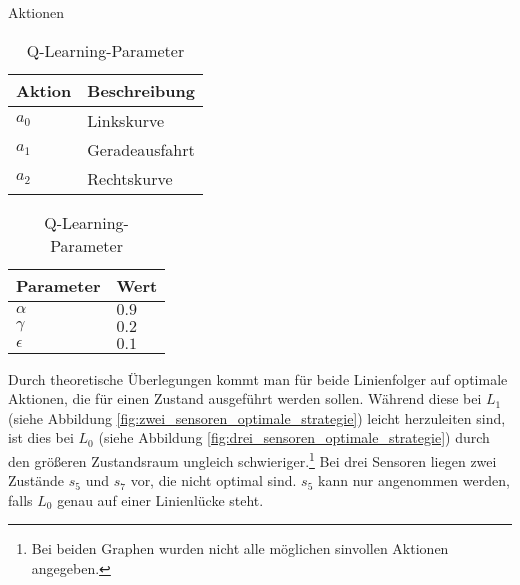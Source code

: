 \begin{table}
\centering

\begin{minipage}{.4\textwidth}
\caption{Aktionen}
  \label{tab:aktionen}
  \renewcommand{\arraystretch}{1.2}
  \centering
  \sffamily
  \begin{footnotesize}
    \begin{tabular}{l l}
    \toprule
    \textbf{Aktion} & \textbf{Beschreibung}\\
    \midrule
    $a_0$ & Linkskurve\\
    $a_1$ & Ge­ra­de­aus­fahrt\\
    $a_2$ & Rechtskurve\\
    \bottomrule
    \end{tabular}
  \end{footnotesize}
  \rmfamily
\end{minipage}\hfill
\begin{minipage}{.4\textwidth}
\caption{Q-Learning-Parameter}
  \label{tab:q-parameter}
  \renewcommand{\arraystretch}{1.2}
  \centering
  \sffamily
  \begin{footnotesize}
    \begin{tabular}{l l}
    \toprule
    \textbf{Parameter} & \textbf{Wert}\\
    \midrule
    $\alpha$  & $0.9$\\
    $\gamma$  & $0.2$\\
    $\epsilon$  & $0.1$\\
    \bottomrule
    \end{tabular}
  \end{footnotesize}
  \rmfamily
\end{minipage}\hfill

\end{table}

Durch theoretische Überlegungen kommt man für beide Linienfolger auf optimale Aktionen, die für einen Zustand ausgeführt werden sollen. Während diese bei $L_1$ (siehe Abbildung \ref{fig:zwei_sensoren_optimale_strategie}) leicht herzuleiten sind, ist dies bei $L_0$ (siehe Abbildung \ref{fig:drei_sensoren_optimale_strategie}) durch den größeren Zustandsraum ungleich schwieriger.\footnote{Bei beiden Graphen wurden nicht alle möglichen sinvollen Aktionen angegeben.} Bei drei Sensoren liegen zwei Zustände $s_5$ und $s_7$ vor, die nicht optimal sind. $s_5$ kann nur angenommen werden, falls $L_0$ genau auf einer Linienlücke steht.

